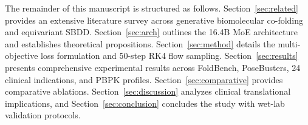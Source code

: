 The remainder of this manuscript is structured as follows. Section~\ref{sec:related} provides an extensive literature survey across generative biomolecular co-folding and equivariant SBDD. Section~\ref{sec:arch} outlines the 16.4B MoE architecture and establishes theoretical propositions. Section~\ref{sec:method} details the multi-objective loss formulation and 50-step RK4 flow sampling. Section~\ref{sec:results} presents comprehensive experimental results across FoldBench, PoseBusters, 24 clinical indications, and PBPK profiles. Section~\ref{sec:comparative} provides comparative ablations. Section~\ref{sec:discussion} analyzes clinical translational implications, and Section~\ref{sec:conclusion} concludes the study with wet-lab validation protocols.